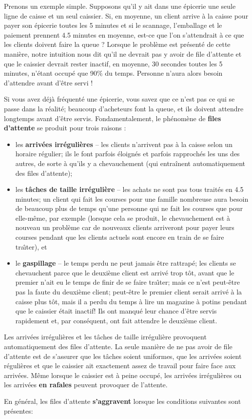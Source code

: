 \newl
Prenons un exemple simple. Supposons qu'il y ait dans une épicerie une seule ligne de caisse et un seul caissier. Si, en moyenne, un client arrive à la caisse pour payer son épicerie toutes les 5 minutes et si le scannage, l'emballage et le paiement prennent 4.5 minutes en moyenne, est-ce que l'on s'attendrait à ce que les clients doivent faire la queue ? Lorsque le problème est présenté de cette manière, notre intuition nous dit qu'il ne devrait pas y avoir de file d'attente et que le caissier devrait rester inactif, en moyenne, 30 secondes toutes les 5 minutes, n'étant occupé que 90\% du temps. Personne n'aura alors besoin d'attendre avant d'être servi ! \par Si vous avez déjà fréquenté une épicerie, vous savez que ce n'est pas ce qui se passe dans la réalité; beaucoup d'acheteurs font la queue, et ils doivent attendre longtemps avant d'être servis. 
 Fondamentalement, le phénomène de \textbf{files d'attente} se produit pour trois raisons :
  \begin{itemize}
 \item les \textbf{arrivées irrégulières} -- les clients n'arrivent pas à la caisse selon un horaire régulier; ils le font parfois éloignés et parfois rapprochés les uns des autres, de sorte \`a qu'ils y a chevauchement (qui entraînent automatiquement des files d'attente);
 \item les \textbf{tâches de taille irrégulière} -- les achats ne sont pas tous traités en 4.5 minutes; un client qui fait les courses pour une famille nombreuse aura besoin de beaucoup plus de temps qu'une personne qui ne fait les courses que pour elle-même, par exemple (lorsque cela se produit, le chevauchement est à nouveau un problème car de nouveaux clients  arriveront pour payer leurs courses pendant que les clients actuels sont encore en train de se faire tra\^{\i}ter), et  
\item le \textbf{gaspillage} -- le temps perdu ne peut jamais être rattrapé; les clients se chevauchent parce que le deuxième client est arrivé trop tôt, avant que le premier n'ait eu le temps de finir de se faire tra\^{\i}ter; mais ce n'est peut-être pas la faute du deuxième client; peut-être le premier client serait arriv\'e \`a la caisse plus tôt, mais il a perdu du temps à lire un magazine à potins pendant que le caissier était inactif! Ils ont manqué leur chance d'être servis rapidement et, par conséquent, ont fait attendre le deuxième client.
\end{itemize}
Les arrivées irrégulières et les t\^aches de taille irr\'eguli\`ere provoquent automatiquement des files d'attente. La seule mani\`ere de ne pas avoir de file d'attente est de s'assurer que les tâches soient uniformes, que les arrivées soient régulières et que le caissier ait exactement assez de travail pour faire face aux arrivées. Même lorsque le caissier est à peine occupé, les arrivées irrégulières ou les arrivées \textbf{en rafales} peuvent provoquer de l'attente. \par En général, les files d'attente \textbf{s'aggravent} lorsque les conditions suivantes sont présentes:
